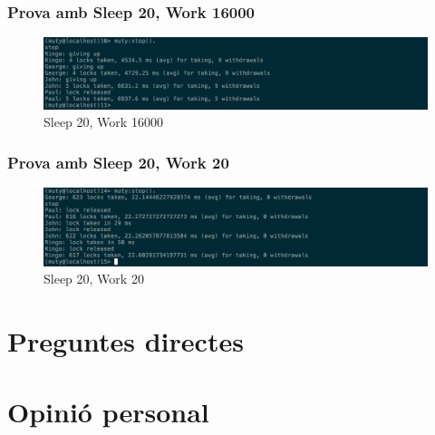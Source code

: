 \documentclass[a4paper, 11pt]{article}
\begin{document}
\subsubsection{Prova amb Sleep 20, Work 16000}

\begin{figure}[H]
    \centering
    \includegraphics[width=1.0\textwidth]{figures/20-16000lock3}
    \caption{Sleep 20, Work 16000 \label{fig:20-16000lock3}}    
\end{figure}

\subsubsection{Prova amb Sleep 20, Work 20}

\begin{figure}[H]
    \centering
    \includegraphics[width=1.0\textwidth]{figures/20-20lock3}
    \caption{Sleep 20, Work 20 \label{fig:20-20lock3}}    
\end{figure}

\section{Preguntes directes}


\section{Opinió personal}
\end{document}

